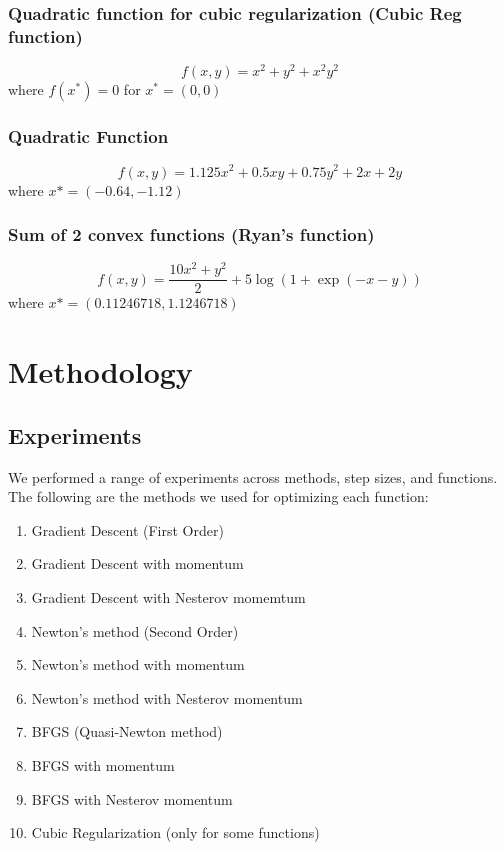 \documentclass{article}
\begin{document}
\subsubsection{Quadratic function for cubic regularization (Cubic Reg function)}
\begin{equation}
f(x,y) = x^2 +y^2 + x^2y^2
\end{equation}
where $f(x^*) = 0$ for $x^* = (0,0)$

\subsubsection{Quadratic Function}
\begin{equation}
f(x,y) = 1.125x^2 + 0.5xy + 0.75y^2 + 2x + 2y
\end{equation}
where $x* = (-0.64,-1.12)$

\subsubsection{Sum of 2 convex functions (Ryan's function)}
\begin{equation}
f(x,y) = \frac{10x^2 + y^2}{2} + 5\log(1+\exp(-x-y))
\end{equation}
where $x* = (0.11246718,1.1246718)$



\section{Methodology}\label{experiments}

\subsection{Experiments}
We performed a range of experiments across methods, step sizes, and functions. The following are the methods we used for optimizing each function:
\begin{enumerate}
	\item Gradient Descent (First Order)
	\item Gradient Descent with momentum
	\item Gradient Descent with Nesterov momemtum
	\item Newton's method (Second Order)
	\item Newton's method with momentum 
	\item Newton's method with Nesterov momentum
	\item BFGS (Quasi-Newton method)
	\item BFGS with momentum
	\item BFGS with Nesterov momentum
	\item Cubic Regularization (only for some functions)
\end{enumerate}
\end{document}
